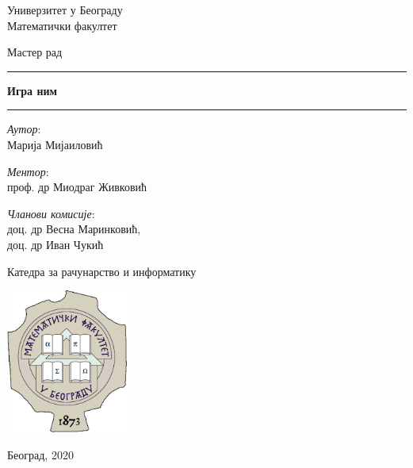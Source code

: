 \begin{titlepage}
    \begin{center}
        \vspace{0.5cm}
        
        \Large{
	        Универзитет у Београду\\
	        Математички факултет\\
        }
    
        \vspace{0.5cm}
        \Large{Мастер рад}    
        
        \vspace{2.0cm}
        
        \Huge
        \rule[0.5cm]{\textwidth}{0.5pt}
        \textbf{Игра ним}
        \rule{\textwidth}{0.5pt}
        \vspace{0.5cm}
        
        \vspace{2.0cm}
        
        \begin{minipage}[t]{0.47\textwidth}\raggedright
        	\textnormal{\large{\textit{Аутор}:\\}}
        	{\large Марија Мијаиловић\\}
        \end{minipage}
		\hfill
		\begin{minipage}[t]{0.47\textwidth}\raggedleft
        	\textnormal{\large{\textit{Ментор}:\\}}
        	{\large проф. др Миодраг Живковић\\}
        	
        	\vspace*{15pt}
        	
        	{\large{\textit{Чланови комисије}:\\}} 
        	{\large доц. др Весна Маринковић,\\}
        	{\large доц. др Иван Чукић\\}
        \end{minipage}
        
        \vfill
        
        {\Large Катедра за рачунарство и информатику}
        
        \vspace{0.8cm}
        
        \includegraphics[width=0.3\textwidth]{matf_logo.png}
        
        \large{Београд, 2020}
        
    \end{center}
\end{titlepage}